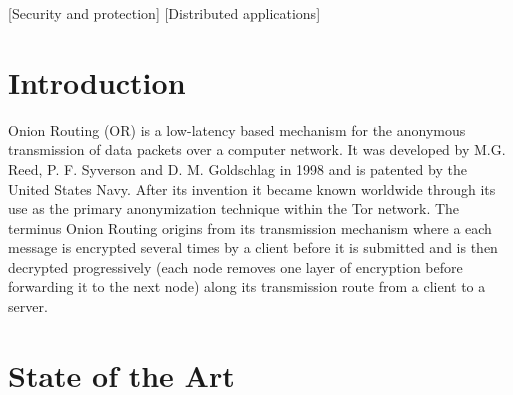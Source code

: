 \documentclass{sig-alternate}
\begin{document}
[Security and protection]
[Distributed applications]



\section{Introduction}
Onion Routing (OR) is a low-latency based mechanism for the anonymous transmission of data packets over a computer network. It was developed by M.G. Reed, P. F. Syverson and D. M. Goldschlag in 1998\cite{reed1998anonymous} and is patented by the United States Navy. After its invention it became known worldwide through its use as the primary anonymization technique within the Tor network\cite{tor}. The terminus Onion Routing origins from its transmission mechanism where a each message is encrypted several times by a client before it is submitted and is then decrypted progressively (each node removes one layer of encryption before forwarding it to the next node) along its transmission route from a client to a server. 


\section{State of the Art}
\end{document}
